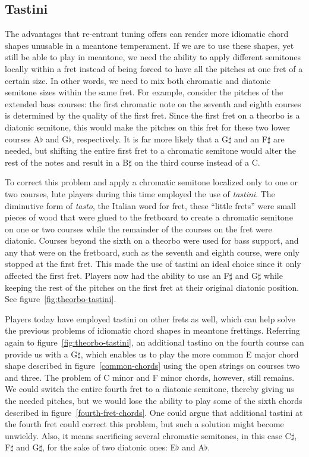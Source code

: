 \subsection{Tastini}

The advantages that re-entrant tuning offers can render more idiomatic chord shapes unusable in a meantone temperament.
If we are to use these shapes, yet still be able to play in meantone, we need the ability to apply different semitones
locally within a fret instead of being forced to have all the pitches at one fret of a certain size. In other words, we
need to mix both chromatic and diatonic semitone sizes within the same fret. For example, consider the pitches of the
extended bass courses: the first chromatic note on the seventh and eighth courses is determined by the quality of the
first fret. Since the first fret on a theorbo is a diatonic semitone, this would make the pitches on this fret for these
two lower courses A$\flat$ and G$\flat$, respectively. It is far more likely that a G$\sharp$ and an F$\sharp$ are
needed, but shifting the entire first fret to a chromatic semitone would alter the rest of the notes and result in a
B$\sharp$ on the third course instead of a C.

To correct this problem and apply a chromatic semitone localized only to one or two courses, lute players during this
time employed the use of \textit{tastini}. The diminutive form of \textit{tasto}, the Italian word for fret, these
``little frets'' were small pieces of wood that were glued to the fretboard to create a chromatic semitone on one or two
courses while the remainder of the courses on the fret were diatonic. Courses beyond the sixth on a theorbo were used
for bass support, and any that were on the fretboard, such as the seventh and eighth course, were only stopped at the
first fret. This made the use of tastini an ideal choice since it only affected the first fret. Players now had the
ability to use an F$\sharp$ and G$\sharp$ while keeping the rest of the pitches on the first fret at their original
diatonic position. See figure~\ref{fig:theorbo-tastini}.



Players today have employed tastini on other frets as well, which can help solve the previous problems of idiomatic
chord shapes in meantone frettings. Referring again to figure~\ref{fig:theorbo-tastini}, an additional tastino on the
fourth course can provide us with a G$\sharp$, which enables us to play the more common E major chord shape described in
figure~\ref{common-chords} using the open strings on courses two and three. The problem of C minor and F minor chords,
however, still remains. We could switch the entire fourth fret to a diatonic semitone, thereby giving us the needed
pitches, but we would lose the ability to play some of the sixth chords described in figure~\ref{fourth-fret-chords}.
One could argue that additional tastini at the fourth fret could correct this problem, but such a solution might become
unwieldy. Also, it means sacrificing several chromatic semitones, in this case C$\sharp$, F$\sharp$ and G$\sharp$, for
the sake of two diatonic ones: E$\flat$ and A$\flat$.

